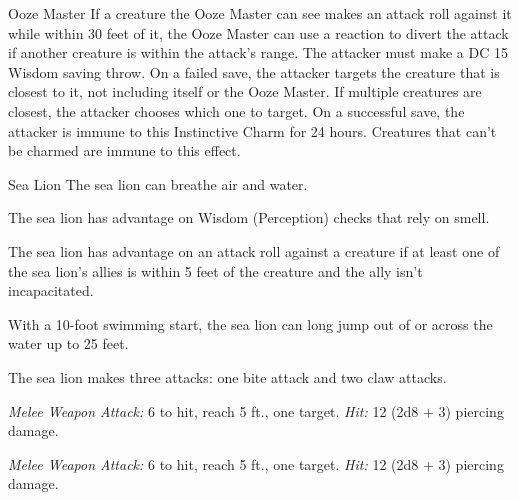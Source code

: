 \documentclass[10pt,a4paper,twoside,bg=print,twocolumn,openany,nodeprecatedcode]{dndbook}
\begin{document}
\begin{DndMonster}[float=t]{Ooze Master}
If a creature the Ooze Master can see makes an attack roll against it while within 30 feet of it, the Ooze Master can use a reaction to divert the attack if another creature is within the attack's range. The attacker must make a DC 15 Wisdom saving throw. On a failed save, the attacker targets the creature that is closest to it, not including itself or the Ooze Master. If multiple creatures are closest, the attacker chooses which one to target. On a successful save, the attacker is immune to this Instinctive Charm for 24 hours. Creatures that can't be charmed are immune to this effect.

\end{DndMonster}



\begin{DndMonster}[float=t]{Sea Lion}
\DndMonsterBasics[
armor-class = {15 (natural armor)},
hit-points = {\DndDice{12d10 + 24}},
speed = {10 ft., swim 40 ft.}
]
\DndMonsterAbilityScores[
 str = 17,
 dex = 15,
 con = 15,
 int = 3,
 wis = 12,
 cha = 8
]
\DndMonsterDetails[
skills = {Perception +4, Stealth +5},
challenge = 5,
]
The sea lion can breathe air and water.

The sea lion has advantage on Wisdom (Perception) checks that rely on smell.

The sea lion has advantage on an attack roll against a creature if at least one of the sea lion's allies is within 5 feet of the creature and the ally isn't incapacitated.

With a 10-foot swimming start, the sea lion can long jump out of or across the water up to 25 feet.

The sea lion makes three attacks: one bite attack and two claw attacks.

\textsl{Melee Weapon Attack:} 6 to hit, reach 5 ft., one target. \textsl{Hit:} 12 (2d8 + 3) piercing damage.

\textsl{Melee Weapon Attack:} 6 to hit, reach 5 ft., one target. \textsl{Hit:} 12 (2d8 + 3) piercing damage.

\end{DndMonster}
\end{document}
